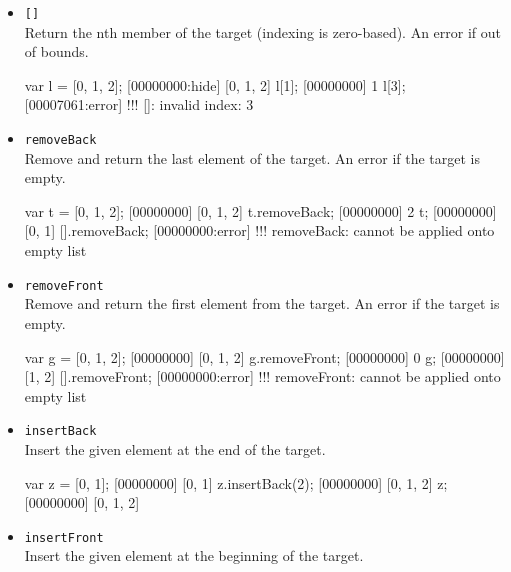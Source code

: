 \begin{itemize}

\item \lstinline|[]|\\
\label{sec:std-list-nth}
Return the nth member of the target (indexing is zero-based). An error
if out of bounds.

\begin{urbiscript}[firstnumber=last]
var l = [0, 1, 2];
[00000000:hide] [0, 1, 2]
l[1];
[00000000] 1
l[3];
[00007061:error] !!! []: invalid index: 3
\end{urbiscript}

\item \lstinline|removeBack|\\
Remove and return the last element of the target. An error if the
target is empty.

\begin{urbiscript}[firstnumber=last]
var t = [0, 1, 2];
[00000000] [0, 1, 2]
t.removeBack;
[00000000] 2
t;
[00000000] [0, 1]
[].removeBack;
[00000000:error] !!! removeBack: cannot be applied onto empty list
\end{urbiscript}

\item \lstinline|removeFront|\\
Remove and return the first element from the target. An error if the
target is empty.

\begin{urbiscript}[firstnumber=last]
var g = [0, 1, 2];
[00000000] [0, 1, 2]
g.removeFront;
[00000000] 0
g;
[00000000] [1, 2]
[].removeFront;
[00000000:error] !!! removeFront: cannot be applied onto empty list
\end{urbiscript}

\item \lstinline|insertBack|\\
\label{sec:std-list-pushback}
Insert the given element at the end of the target.

\begin{urbiscript}[firstnumber=last]
var z = [0, 1];
[00000000] [0, 1]
z.insertBack(2);
[00000000] [0, 1, 2]
z;
[00000000] [0, 1, 2]
\end{urbiscript}

\item \lstinline|insertFront|\\
Insert the given element at the beginning of the target.


\end{itemize}
